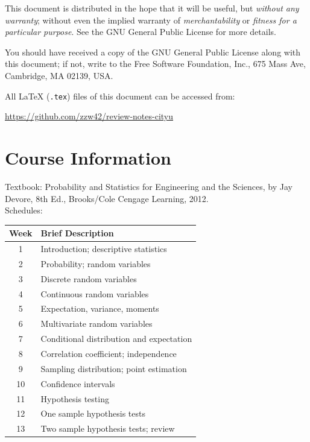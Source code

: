 \documentclass[UTF8,a4paper,10pt,openany]{book}
\theoremstyle{plain}
\theoremstyle{definition}
\begin{document}
This document is distributed in the hope that it will be useful, but \emph{without any warranty}; without even the implied warranty of \emph{merchantability} or \emph{fitness for a particular purpose}. See the GNU General Public License for more details.

You should have received a copy of the GNU General Public License along with this document; if not, write to the Free Software Foundation, Inc., 675 Mass Ave, Cambridge, MA 02139, USA.

All \LaTeX{} (\texttt{.tex}) files of this document can be accessed from:

\url{https://github.com/zzw42/review-notes-cityu}

\newpage



\tableofcontents
\listoffigures

\chapter*{Course Information}
Textbook: Probability and Statistics for Engineering and the Sciences, by Jay Devore, 8th Ed., Brooks/Cole Cengage Learning, 2012. 
\\

Schedules:

\begin{center}
\begin{tabular}{cl}
\hline\hline
Week & Brief Description \\
\hline
1 & Introduction; descriptive statistics \\
2 & Probability; random variables \\
3 & Discrete random variables \\
4 & Continuous random variables \\
5 & Expectation, variance, moments \\
6 & Multivariate random variables \\
7 & Conditional distribution and expectation \\
8 & Correlation coefficient; independence \\
9 & Sampling distribution; point estimation \\
10 & Confidence intervals  \\
11 & Hypothesis testing \\
12 & One sample hypothesis tests \\
13 & Two sample hypothesis tests; review \\
\hline\hline
\end{tabular}
\end{center}

\mainmatter
\clearpage
\setcounter{page}{1}









\end{document}
